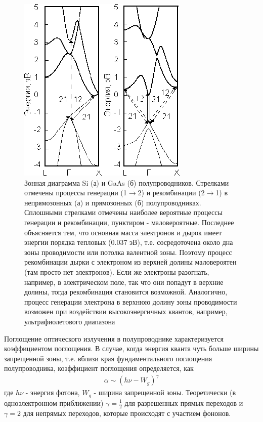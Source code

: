 \documentclass[a4paper,12pt]{article}
\begin{document}
\begin{figure}[H]
	\centering
	\includegraphics[]{3}
	\caption{Зонная диаграмма Si (а) и GaAs (б) полупроводников. 
Стрелками отмечены процессы генерации (1$\to$2) и рекомбинации (2$\to$1) в непрямозонных (а) и прямозонных (б) полупроводниках.    Сплошными
стрелками отмечены наиболее вероятные процессы генерации и рекомбинации, пунктиром - маловероятные. Последнее объясняется тем, что основная масса электронов и дырок имеет энергии порядка тепловых (0.037 эВ), т.е. сосредоточена около дна зоны проводимости или потолка валентной зоны. Поэтому процесс рекомбинации дырки с электроном из верхней долины маловероятен (там просто нет электронов). Если же электроны разогнать, например, в электрическом поле, так что они попадут в верхние долины, тогда рекомбинация становится возможной. Аналогично, процесс генерации электрона в верхнюю долину зоны проводимости возможен при воздействии высокоэнергичных квантов, например, ультрафиолетового диапазона}
	\label{fig:figure2}
\end{figure}
% 

Поглощение оптического излучения в полупроводнике характеризуется коэффициентом поглощения. В случае, когда энергия кванта чуть больше ширины запрещенной зоны, т.е. вблизи края фундаментального поглощения полупроводника, коэффициент поглощения определяется, как 
\begin{gather}
	\label{eq3}
	\alpha \sim\left(h\nu-W_{g}\right)^{\gamma}
\end{gather}
где $h\nu$ - энергия фотона, $W_g$ - ширина запрещенной зоны. Теоретически (в одноэлектронном приближении) $\gamma=\frac12$ для разрешенных
прямых переходов и $\gamma=2$ для непрямых переходов, которые происходят с участием фононов.
\end{document}
